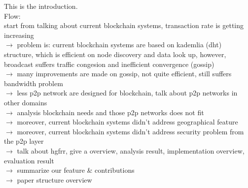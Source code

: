 This is the introduction.\\

Flow: \\
start from talking about current blockchain systems, transaction rate is getting increasing \\
$\rightarrow$
problem is: current blockchain systems are based on kademlia (dht) structure, which is efficient on node discovery and data look up, however, broadcast suffers traffic congesion and inefficient convergence (gossip)\\
$\rightarrow$
many improvements are made on gossip, not quite efficient, still suffers bandwidth problem\\
$\rightarrow$
less p2p network are designed for blockchain, talk about p2p networks in other domains\\
$\rightarrow$
analysis blockchain needs and those p2p networks does not fit\\
$\rightarrow$
moreover, current blockchain systems didn't address geographical feature\\
$\rightarrow$
moreover, current blockchain systems didn't address security problem from the p2p layer\\
$\rightarrow$
talk about hgfrr, give a overview, analysis result, implementation overview, evaluation result\\
$\rightarrow$
summarize our feature \& contributions\\
$\rightarrow$
paper structure overview